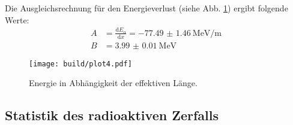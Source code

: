 Die Ausgleichsrechnung für den Energieverlust (siehe Abb. \ref{fig:plot4}) ergibt folgende Werte:
\begin{align*}
  A &= \frac{\text{d}E_\alpha}{\text{d}x} = \SI{-77.49(146)}{\mega\eV\per\meter} \\
  B &= \SI{3.99(1)}{\mega\eV}
\end{align*}
\begin{figure}
  \centering
  \texttt{[image: build/plot4.pdf]}
  \caption{Energie in Abhängigkeit der effektiven Länge.}
  \label{fig:plot4}
\end{figure}

\subsection{Statistik des radioaktiven Zerfalls}
\label{sec:Zufall}

